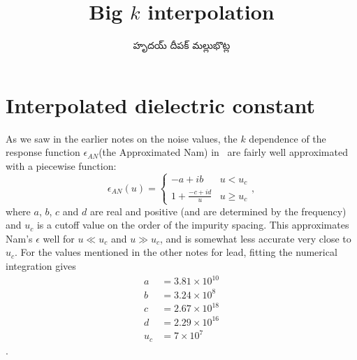 \documentclass[../main.tex]{subfiles}
\title{Big $k$ interpolation}
\author{\begin{telugu}హృదయ్ దీపక్ మల్లుభొట్ల\end{telugu}}
\date{}
\begin{document}
	\graphicspath{{\main/figures/}}
	\onlyinsubfile{\maketitle}
	\section{Interpolated dielectric constant} \label{sec:bigkinterpolation}

	As we saw in the earlier notes on the noise values, the $k$ dependence of the response function $\epsilon_{AN}$(the Approximated Nam) in~\cite{Nam1967} are fairly well approximated with a piecewise function:
	\begin{equation}
		\epsilon_{AN}(u) =
		\begin{cases}
			-a + i b & u < u_c \\
			1 + \frac{-c + i d}{u} & u \geq u_c
		\end{cases}, \label{eq:epsAN}
	\end{equation}
	where $a$, $b$, $c$ and $d$ are real and positive (and are determined by the frequency) and $u_c$ is a cutoff value on the order of the impurity spacing.
	This approximates Nam's $\epsilon$ well for $u \ll u_c$ and $u \gg u_c$, and is somewhat less accurate very close to $u_c$.
	For the values mentioned in the other notes for lead, fitting the numerical integration gives
	\begin{align}
		a &= 3.81 \times 10^{10} \\
		b &= 3.24 \times 10^{8} \\
		c &= 2.67 \times 10^{18} \\
		d &= 2.29 \times 10^{16} \\
		u_c &= 7 \times 10^{7}
	\end{align}.
\end{document}
